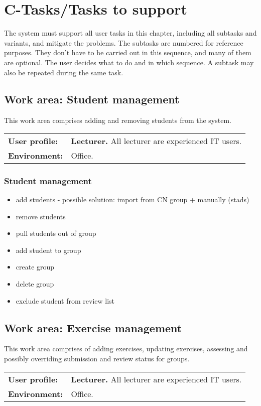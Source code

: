 \documentclass[Main]{subfiles}
\begin{document}
\chapter{C-Tasks/Tasks to support}
The system must support all user tasks in this chapter, including all subtasks and variants, and mitigate the problems. The subtasks are numbered for reference purposes. They don't have to be carried out in this sequence, and many of them are optional. The user decides what to do and in which sequence. A subtask may also be repeated during the same task.

\section{Work area: Student management}
This work area comprises adding and removing students from the system.

\begin{tabular}{l l}
 \textbf{User profile:} & \textbf{Lecturer.} All lecturer are experienced IT users. \\
 \textbf{Environment:} & Office.
\end{tabular}

\subsection{Student management}

\begin{itemize}
\item add students - possible solution: import from CN group + manually (stads) 
\item remove students
\item pull students out of group
\item add student to group
\item create group
\item delete group
\item exclude student from review list
\end{itemize}

\section{Work area: Exercise management}
This work area comprises of adding exercises, updating exercises, assessing and possibly overriding submission and review status for groups.

\begin{tabular}{l l}
 \textbf{User profile:} & \textbf{Lecturer.} All lecturer are experienced IT users. \\
 \textbf{Environment:} & Office.
\end{tabular}
\end{document}
